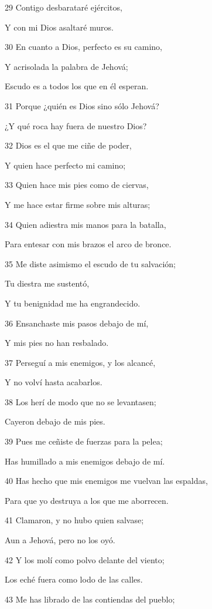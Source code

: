 \par 29 Contigo desbarataré ejércitos,
\par Y con mi Dios asaltaré muros.
\par 30 En cuanto a Dios, perfecto es su camino,
\par Y acrisolada la palabra de Jehová;
\par Escudo es a todos los que en él esperan.
\par 31 Porque ¿quién es Dios sino sólo Jehová?
\par ¿Y qué roca hay fuera de nuestro Dios?
\par 32 Dios es el que me ciñe de poder,
\par Y quien hace perfecto mi camino;
\par 33 Quien hace mis pies como de ciervas,
\par Y me hace estar firme sobre mis alturas;
\par 34 Quien adiestra mis manos para la batalla,
\par Para entesar con mis brazos el arco de bronce.
\par 35 Me diste asimismo el escudo de tu salvación;
\par Tu diestra me sustentó,
\par Y tu benignidad me ha engrandecido.
\par 36 Ensanchaste mis pasos debajo de mí,
\par Y mis pies no han resbalado.
\par 37 Perseguí a mis enemigos, y los alcancé,
\par Y no volví hasta acabarlos.
\par 38 Los herí de modo que no se levantasen;
\par Cayeron debajo de mis pies.
\par 39 Pues me ceñiste de fuerzas para la pelea;
\par Has humillado a mis enemigos debajo de mí.
\par 40 Has hecho que mis enemigos me vuelvan las espaldas,
\par Para que yo destruya a los que me aborrecen.
\par 41 Clamaron, y no hubo quien salvase;
\par Aun a Jehová, pero no los oyó.
\par 42 Y los molí como polvo delante del viento;
\par Los eché fuera como lodo de las calles.
\par 43 Me has librado de las contiendas del pueblo;
